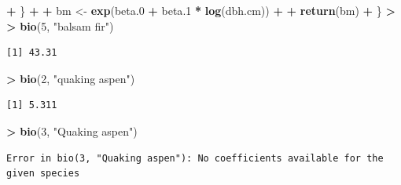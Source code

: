 \documentclass[]{krantz}
\makeatletter
\newenvironment{Shaded}{\begin{snugshade}}{\end{snugshade}}
\newcommand{\DecValTok}[1]{\textcolor[rgb]{0.06,0.06,0.06}{#1}}
\newcommand{\ErrorTok}[1]{\textcolor[rgb]{0.14,0.14,0.14}{\textbf{#1}}}
\newcommand{\FloatTok}[1]{\textcolor[rgb]{0.06,0.06,0.06}{#1}}
\newcommand{\KeywordTok}[1]{\textcolor[rgb]{0.27,0.27,0.27}{\textbf{#1}}}
\newcommand{\NormalTok}[1]{#1}
\newcommand{\OperatorTok}[1]{\textcolor[rgb]{0.43,0.43,0.43}{\textbf{#1}}}
\newcommand{\StringTok}[1]{\textcolor[rgb]{0.5,0.5,0.5}{#1}}
\newenvironment{kframe}{%
\medskip{}
\setlength{\fboxsep}{.8em}
 \def\at@end@of@kframe{}%
 \ifinner\ifhmode%
  \def\at@end@of@kframe{\end{minipage}}%
  \begin{minipage}{\columnwidth}%
 \fi\fi%
 \def\FrameCommand##1{\hskip\@totalleftmargin \hskip-\fboxsep
 \colorbox{shadecolor}{##1}\hskip-\fboxsep
     \hskip-\linewidth \hskip-\@totalleftmargin \hskip\columnwidth}%
 \MakeFramed {\advance\hsize-\width
   \@totalleftmargin\z@ \linewidth\hsize
   \@setminipage}}%
 {\par\unskip\endMakeFramed%
 \at@end@of@kframe}
\renewenvironment{Shaded}{\begin{kframe}}{\end{kframe}}
\makeatother
\begin{document}
\begin{Shaded}
\begin{Highlighting}[]
\OperatorTok{+}\StringTok{   }\NormalTok{\}}
\OperatorTok{+}\StringTok{   }
\OperatorTok{+}\StringTok{   }\NormalTok{bm <-}\StringTok{ }\KeywordTok{exp}\NormalTok{(beta}\FloatTok{.0} \OperatorTok{+}\StringTok{ }\NormalTok{beta}\FloatTok{.1} \OperatorTok{*}\StringTok{ }\KeywordTok{log}\NormalTok{(dbh.cm))}
\OperatorTok{+}\StringTok{   }
\OperatorTok{+}\StringTok{   }\KeywordTok{return}\NormalTok{(bm)}
\OperatorTok{+}\StringTok{ }\NormalTok{\}}
\OperatorTok{>}\StringTok{ }
\ErrorTok{>}\StringTok{ }\KeywordTok{bio}\NormalTok{(}\DecValTok{5}\NormalTok{, }\StringTok{"balsam fir"}\NormalTok{)}
\end{Highlighting}
\end{Shaded}

\begin{verbatim}
[1] 43.31
\end{verbatim}

\begin{Shaded}
\begin{Highlighting}[]
\OperatorTok{>}\StringTok{ }\KeywordTok{bio}\NormalTok{(}\DecValTok{2}\NormalTok{, }\StringTok{"quaking aspen"}\NormalTok{)}
\end{Highlighting}
\end{Shaded}

\begin{verbatim}
[1] 5.311
\end{verbatim}

\begin{Shaded}
\begin{Highlighting}[]
\OperatorTok{>}\StringTok{ }\KeywordTok{bio}\NormalTok{(}\DecValTok{3}\NormalTok{, }\StringTok{"Quaking aspen"}\NormalTok{)}
\end{Highlighting}
\end{Shaded}

\begin{verbatim}
Error in bio(3, "Quaking aspen"): No coefficients available for the given species
\end{verbatim}
\end{document}
